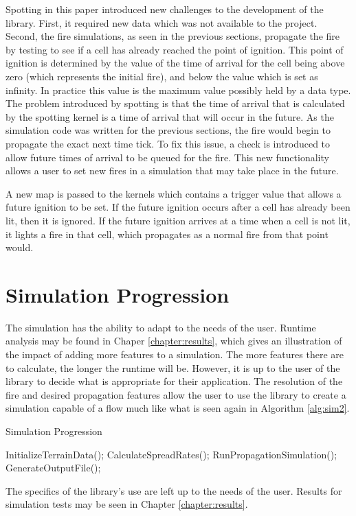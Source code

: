 Spotting in this paper introduced new challenges to the development of the library. First, it required new data which was not available to the project. Second, the fire simulations, as seen in the previous sections, propagate the fire by testing to see if a cell has already reached the point of ignition. This point of ignition is determined by the value of the time of arrival for the cell being above zero (which represents the initial fire), and below the value which is set as infinity. In practice this value is the maximum value possibly held by a data type. The problem introduced by spotting is that the time of arrival that is calculated by the spotting kernel is a time of arrival that will occur in the future. As the simulation code was written for the previous sections, the fire would begin to propagate the exact next time tick. To fix this issue, a check is introduced to allow future times of arrival to be queued for the fire. This new functionality allows a user to set new fires in a simulation that may take place in the future. 

A new map is passed to the kernels which contains a trigger value that allows a future ignition to be set. If the future ignition occurs after a cell has already been lit, then it is ignored. If the future ignition arrives at a time when a cell is not lit, it lights a fire in that cell, which propagates as a normal fire from that point would. 

\section{Simulation Progression}
The simulation has the ability to adapt to the needs of the user. Runtime analysis may be found in Chaper \ref{chapter:results}, which gives an illustration of the impact of adding more features to a simulation. The more features there are to calculate, the longer the runtime will be. However, it is up to the user of the library to decide what is appropriate for their application. The resolution of the fire and desired propagation features allow the user to use the library to create a simulation capable of a flow much like what is seen again in Algorithm \ref{alg:sim2}.

\begin{algorithm}
  \caption{Simulation Progression}
  \label{alg:sim2}
  \begin{algorithmic}
  \STATE InitializeTerrainData();
  \STATE CalculateSpreadRates();
  \STATE RunPropagationSimulation();
  \ENDWHILE  
  \STATE GenerateOutputFile();
  \end{algorithmic}
\end{algorithm}

The specifics of the library's use are left up to the needs of the user. Results for simulation tests may be seen in Chapter \ref{chapter:results}. 